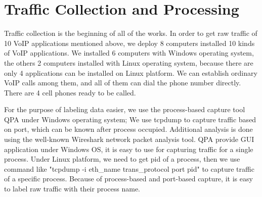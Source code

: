 \documentclass[conference]{IEEEtran}
\begin{document}

\section{Traffic Collection and Processing}
\label{sec:trafficcollectionandprocessing}
Traffic collection is the beginning of all of the works. In order to get raw traffic of 10 VoIP applications mentioned above, we deploy 8 computers installed 10 kinds of VoIP applications. We installed 6 computers with Windows operating system, the others 2 computers installed with Linux operating system, because there are only 4 applications can be installed on Linux platform. We can establish ordinary VoIP calls among them, and all of them can dial the phone number directly. There are 4 cell phones ready to be called.



For the purpose of labeling data easier, we use the process-based capture tool QPA under Windows operating system; We use tcpdump to capture traffic based on port, which can be known after process occupied. Additional analysis is done using the well-known Wireshark network packet analysis tool. QPA provide GUI application under Windows OS, it is easy to use for capturing traffic for a single process. Under Linux platform, we need to get pid of a process, then we use command like "tcpdump -i eth\_name trans\_protocol port pid" to capture traffic of a specific process. Because of process-based and port-based capture, it is easy to label raw traffic with their process name.
\end{document}
